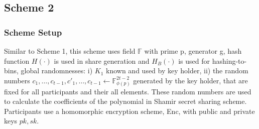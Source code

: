 \subsection{Scheme 2}
\subsubsection{Scheme Setup}
Similar to Scheme 1, this scheme uses field $\mathbb{F}$ with prime p, generator g, hash function $H(\cdot)$ is used in share generation and $H_B(\cdot)$ is used for hashing-to-bins, global randomnesses: i) $K_1$ known and used by key holder, ii) the random numbers $c_1, \dots, c_{t-1}, c'_1, \ldots, c_{t-1} \gets \mathbb{F}_{\phi(p)}^{2t-2}$ generated by the key holder, that are fixed for all participants and their all elements. These random numbers are used to calculate the coefficients of the polynomial in Shamir secret sharing scheme. Participants use a homomorphic encryption scheme, Enc, with public and private keys $pk, sk$.
